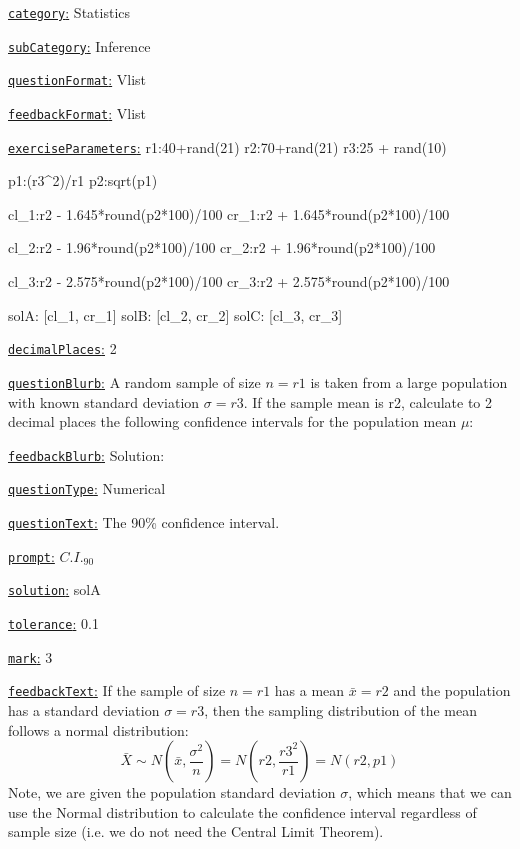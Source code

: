 \documentclass[preview]{standalone}
\newcommand \fieldname[1]{\underline{\texttt{#1}:}}
\begin{document}
\fieldname{category}  %
Statistics

\fieldname{subCategory} %
Inference

\fieldname{questionFormat}
Vlist

\fieldname{feedbackFormat}
Vlist

\fieldname{exerciseParameters}
r1:40+rand(21)
r2:70+rand(21)
r3:25 + rand(10)

p1:(r3^2)/r1
p2:sqrt(p1)

cl_1:r2 - 1.645*round(p2*100)/100
cr_1:r2 + 1.645*round(p2*100)/100

cl_2:r2 - 1.96*round(p2*100)/100
cr_2:r2 + 1.96*round(p2*100)/100

cl_3:r2 - 2.575*round(p2*100)/100
cr_3:r2 + 2.575*round(p2*100)/100

solA: [cl_1, cr_1]
solB: [cl_2, cr_2]
solC: [cl_3, cr_3]

\fieldname{decimalPlaces}
2

\fieldname{questionBlurb}
A random sample of size $n={r1}$ is taken from a large population with known standard deviation $\sigma = {r3}$. If the sample mean is {r2}, calculate to 2 decimal places the following confidence intervals for the population mean $\mu$:

\fieldname{feedbackBlurb}
Solution:

\fieldname{questionType}
Numerical

\fieldname{questionText}
The 90\% confidence interval.

\fieldname{prompt}
$C.I._{90}$

\fieldname{solution}
solA

\fieldname{tolerance}
0.1

\fieldname{mark}
3

\fieldname{feedbackText}
If the sample of size $n={r1}$ has a mean $\bar x = {r2}$ and the population has a standard deviation $\sigma={r3}$, then the sampling distribution of the mean follows a normal distribution:
\[
\bar X \sim N \left(\bar x,\frac{\sigma^2}{n}\right) = N \left({r2},\frac{{r3}^2}{{r1}}\right) = N \left({r2},{p1}\right)
\]
Note, we are given the population standard deviation $\sigma$, which means that we can use the Normal distribution to calculate the confidence interval regardless of sample size (i.e. we do not need the Central Limit Theorem).
\end{document}
